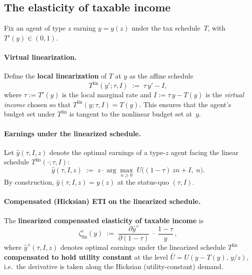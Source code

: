 \documentclass[12pt,a4paper]{article}
\theoremstyle{definition}
\theoremstyle{plain}
\theoremstyle{remark}
\begin{document}
\subsection{The elasticity of taxable income}
\label{sec:ETI}

Fix an agent of type $z$ earning $y = y(z)$ under the tax
schedule~$T$, with $T'(y)\in(0,1)$.

\paragraph{Virtual linearization.}
Define the \textbf{local linearization} of $T$ at $y$ as the
affine schedule
\begin{equation}
\label{eq:linearized-schedule-pert}
  T^{\mathrm{lin}}(y';\tau,I) \;:=\; \tau\, y' - I,
\end{equation}
where $\tau := T'(y)$ is the local marginal rate and
$I := \tau\, y - T(y)$ is the \emph{virtual income} chosen so
that $T^{\mathrm{lin}}(y;\tau,I) = T(y)$. This ensures that the
agent's budget set under $T^{\mathrm{lin}}$ is tangent to the
nonlinear budget set at~$y$.

\paragraph{Earnings under the linearized schedule.}
Let $\hat{y}(\tau,I,z)$ denote the optimal earnings of a
type-$z$ agent facing the linear schedule
$T^{\mathrm{lin}}(\cdot;\tau,I)$:
\begin{equation}
\label{eq:linearized-problem-pert}
  \hat{y}(\tau,I,z)
  \;:=\;
  z\cdot\arg\max_{n\ge 0}\;
  U\!\bigl((1-\tau)\,zn + I,\; n\bigr).
\end{equation}
By construction, $\hat{y}(\tau,I,z) = y(z)$ at the status-quo
$(\tau,I)$.

\paragraph{Compensated (Hicksian) ETI on the linearized schedule.}
The \textbf{linearized compensated elasticity of taxable income} is
\begin{equation}
\label{eq:ETI-lin-def}
  \zeta^c_{\mathrm{lin}}(y)
  \;:=\;
  \frac{\partial \hat{y}^{\,c}}{\partial (1-\tau)}
  \;\cdot\;
  \frac{1-\tau}{y}\,,
\end{equation}
where $\hat{y}^{\,c}(\tau,I,z)$ denotes optimal earnings under
the linearized schedule $T^{\mathrm{lin}}$ \textbf{compensated to hold utility
constant} at the level $\bar U = U(y-T(y),\,y/z)$, i.e.\ the
derivative is taken along the Hicksian (utility-constant) demand.
\end{document}

